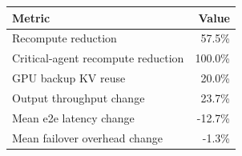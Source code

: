 \begin{tabular}{lr}
\toprule
Metric & Value \\
\midrule
Recompute reduction & 57.5\% \\
Critical-agent recompute reduction & 100.0\% \\
GPU backup KV reuse & 20.0\% \\
Output throughput change & 23.7\% \\
Mean e2e latency change & -12.7\% \\
Mean failover overhead change & -1.3\% \\
\bottomrule
\end{tabular}
